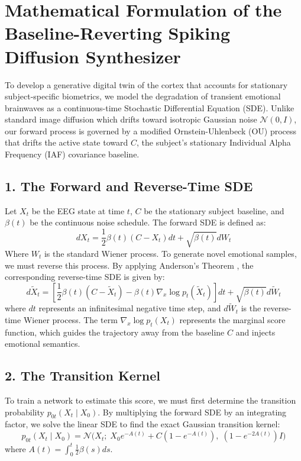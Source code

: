 \documentclass[conference]{IEEEtran}
\begin{document}
\section*{Mathematical Formulation of the Baseline-Reverting Spiking Diffusion Synthesizer}

To develop a generative digital twin of the cortex that accounts for stationary subject-specific biometrics, we model the degradation of transient emotional brainwaves as a continuous-time Stochastic Differential Equation (SDE). Unlike standard image diffusion which drifts toward isotropic Gaussian noise $\mathcal{N}(0, I)$, our forward process is governed by a modified Ornstein-Uhlenbeck (OU) process that drifts the active state toward $C$, the subject's stationary Individual Alpha Frequency (IAF) covariance baseline.

\subsection*{1. The Forward and Reverse-Time SDE}
Let $X_t$ be the EEG state at time $t$, $C$ be the stationary subject baseline, and $\beta(t)$ be the continuous noise schedule. The forward SDE is defined as:
\begin{equation}
    dX_t = \frac{1}{2}\beta(t)(C - X_t) dt + \sqrt{\beta(t)} dW_t
\end{equation}
Where $W_t$ is the standard Wiener process. To generate novel emotional samples, we must reverse this process. By applying Anderson's Theorem \cite{Anderson1982}, the corresponding reverse-time SDE is given by:
\begin{equation}
    d\tilde{X}_t = \left[ \frac{1}{2}\beta(t)(C - \tilde{X}_t) - \beta(t) \nabla_{x} \log p_t(\tilde{X}_t) \right] dt + \sqrt{\beta(t)} d\tilde{W}_t
\end{equation}
where $dt$ represents an infinitesimal negative time step, and $d\tilde{W}_t$ is the reverse-time Wiener process. The term $\nabla_{x} \log p_t(X_t)$ represents the marginal score function, which guides the trajectory away from the baseline $C$ and injects emotional semantics.

\subsection*{2. The Transition Kernel}
To train a network to estimate this score, we must first determine the transition probability $p_{0t}(X_t \mid X_0)$. By multiplying the forward SDE by an integrating factor, we solve the linear SDE to find the exact Gaussian transition kernel:
\begin{equation}
    p_{0t}(X_t \mid X_0) = \mathcal{N}\Big(X_t ;\; X_0 e^{-A(t)} + C(1 - e^{-A(t)}), \; (1 - e^{-2A(t)})I \Big)
\end{equation}
where $A(t) = \int_0^t \frac{1}{2}\beta(s) ds$. 
\end{document}

